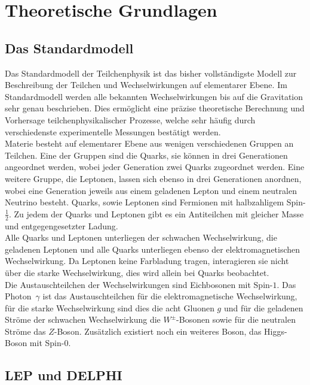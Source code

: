 \documentclass{include/thesisclass3}
\begin{document}
	\FrontMatter
	
	\tableofcontents                  
	\newpage
	\MainMatter


\chapter{Theoretische Grundlagen}

\section{Das Standardmodell}
Das Standardmodell der Teilchenphysik ist das bisher vollständigste Modell zur Beschreibung der Teilchen und Wechselwirkungen auf elementarer Ebene.
Im Standardmodell werden alle bekannten Wechselwirkungen bis auf die Gravitation sehr genau beschrieben.
Dies ermöglicht eine präzise theoretische Berechnung und Vorhersage teilchenphysikalischer Prozesse, welche sehr häufig durch verschiedenste experimentelle Messungen bestätigt werden.
\\
Materie besteht auf elementarer Ebene aus wenigen verschiedenen Gruppen an Teilchen.
Eine der Gruppen sind die Quarks, sie können in drei Generationen angeordnet werden, wobei jeder Generation zwei Quarks zugeordnet werden. 
Eine weitere Gruppe, die Leptonen, lassen sich ebenso in drei Generationen anordnen, wobei eine Generation jeweils aus einem geladenen Lepton und einem neutralen Neutrino besteht.
Quarks, sowie Leptonen sind Fermionen mit halbzahligem Spin-$\frac{1}{2}$. 
Zu jedem der Quarks und Leptonen gibt es ein Antiteilchen mit gleicher Masse und entgegengesetzter Ladung.\\
Alle Quarks und Leptonen unterliegen der schwachen Wechselwirkung, die geladenen Leptonen und alle Quarks unterliegen ebenso der elektromagnetischen Wechselwirkung.
Da Leptonen keine Farbladung tragen, interagieren sie nicht über die starke Wechselwirkung, dies wird allein bei Quarks beobachtet.\\
Die Austauschteilchen der Wechselwirkungen sind Eichbosonen mit Spin-$1$.
Das Photon~$\gamma$ ist das Austauschteilchen für die elektromagnetische Wechselwirkung, für die starke Wechselwirkung sind dies die acht Gluonen $g$ und für die geladenen Ströme der schwachen Wechselwirkung die $W^\pm$-Bosonen sowie für die neutralen Ströme das $Z$-Boson.
Zusätzlich existiert noch ein weiteres Boson, das Higgs-Boson mit Spin-$0$.


\section{LEP und DELPHI}
\end{document}
